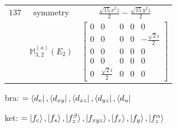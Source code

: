 \documentclass[fleqn,8pt,landscape]{jsarticle}
\begin{document}
\begin{longtable}{ccc}
$ 137 $ & $ \text{symmetry} $ & $ \frac{\sqrt{15} x^{2} z}{2} - \frac{\sqrt{15} y^{2} z}{2} $ \\
$  $ & $ \mathbb{M}_{3,2}^{(a)}(E_{2}) $ & $ \begin{bmatrix} 0 & 0 & 0 & 0 & 0 \\ 0 & 0 & 0 & 0 & - \frac{\sqrt{2} i}{2} \\ 0 & 0 & 0 & 0 & 0 \\ 0 & 0 & 0 & 0 & 0 \\ 0 & \frac{\sqrt{2} i}{2} & 0 & 0 & 0 \end{bmatrix} $ \\ \hline
\end{longtable}
bra: $=\bra{d_{v}}, \bra{d_{xy}}, \bra{d_{xz}}, \bra{d_{yz}}, \bra{d_{u}}$

\noindent
ket: $=\ket{f_{c}}, \ket{f_{s}}, \ket{f_{z}^{\beta}}, \ket{f_{xyz}}, \ket{f_{x}}, \ket{f_{y}}, \ket{f_{z}^{\alpha}}$
\renewcommand{\arraystretch}{1.6}
\end{document}

